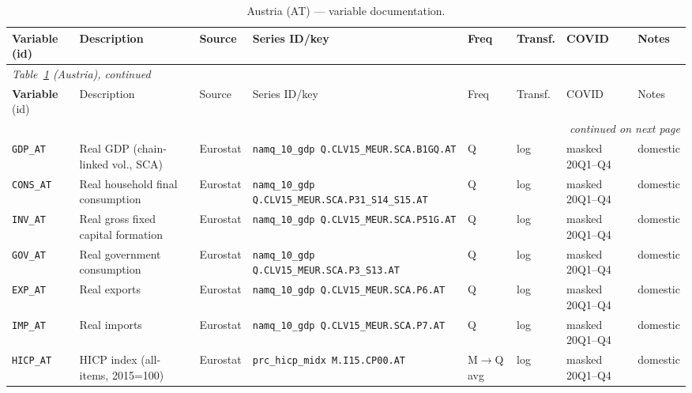 \begin{longtable}{@{}p{}p{}p{}p{}p{}p{}p{}p{}@{}}
\caption{Austria (AT) --- variable documentation.}\label{tab:data:AT}\\
\toprule
\textbf{Variable} (id) & Description & Source & Series ID/key & Freq & Transf. & COVID & Notes \\
\midrule
\endfirsthead
\multicolumn{8}{l}{\small\itshape Table~\ref{tab:data:AT} (Austria), continued}\\
\toprule
\textbf{Variable} (id) & Description & Source & Series ID/key & Freq & Transf. & COVID & Notes \\
\midrule
\endhead
\midrule \multicolumn{8}{r}{\small\itshape continued on next page}\\
\endfoot
\bottomrule
\endlastfoot
\texttt{GDP\_AT}    & Real GDP (chain-linked vol., SCA) & Eurostat & \texttt{namq\_10\_gdp Q.\allowbreak CLV15\_MEUR.\allowbreak SCA.\allowbreak B1GQ.\allowbreak AT} & Q & log & masked 20Q1--Q4 & domestic \\
\texttt{CONS\_AT}   & Real household final consumption & Eurostat & \texttt{namq\_10\_gdp Q.\allowbreak CLV15\_MEUR.\allowbreak SCA.\allowbreak P31\_S14\_S15.\allowbreak AT} & Q & log & masked 20Q1--Q4 & domestic \\
\texttt{INV\_AT}    & Real gross fixed capital formation & Eurostat & \texttt{namq\_10\_gdp Q.\allowbreak CLV15\_MEUR.\allowbreak SCA.\allowbreak P51G.\allowbreak AT} & Q & log & masked 20Q1--Q4 & domestic \\
\texttt{GOV\_AT}    & Real government consumption & Eurostat & \texttt{namq\_10\_gdp Q.\allowbreak CLV15\_MEUR.\allowbreak SCA.\allowbreak P3\_S13.\allowbreak AT} & Q & log & masked 20Q1--Q4 & domestic \\
\texttt{EXP\_AT}    & Real exports & Eurostat & \texttt{namq\_10\_gdp Q.\allowbreak CLV15\_MEUR.\allowbreak SCA.\allowbreak P6.\allowbreak AT} & Q & log & masked 20Q1--Q4 & domestic \\
\texttt{IMP\_AT}    & Real imports & Eurostat & \texttt{namq\_10\_gdp Q.\allowbreak CLV15\_MEUR.\allowbreak SCA.\allowbreak P7.\allowbreak AT} & Q & log & masked 20Q1--Q4 & domestic \\
\texttt{HICP\_AT}   & HICP index (all-items, 2015=100) & Eurostat & \texttt{prc\_hicp\_midx M.\allowbreak I15.\allowbreak CP00.\allowbreak AT} & M$\to$Q avg & log & masked 20Q1--Q4 & domestic \\

\end{longtable}
